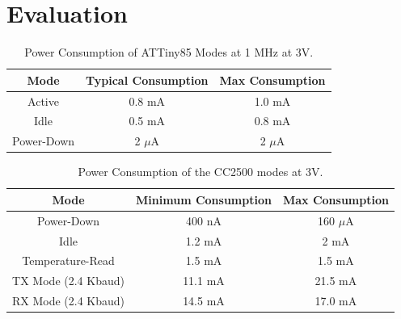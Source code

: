 \section{Evaluation}
\label{section:evaluation}

%
%
\begin{table}%
  \begin{center}
  
  \begin{tabular}{| c | c | c |}

  \hline
  \textbf{Mode} & \textbf{Typical Consumption} & \textbf{Max Consumption} \\
  \hline
  Active      & 0.8 mA & 1.0 mA \\
  Idle        & 0.5 mA & 0.8 mA \\
  Power-Down  & 2 $\mu$A & 2 $\mu$A \\
  \hline
  
  \end{tabular}
  \end{center}
  \caption{Power Consumption of ATTiny85 Modes at 1 MHz at 3V.
  \label{table:attiny85_power}  
  }
\end{table}

%
%
\begin{table}%
  \begin{center}
  
  \begin{tabular}{| c | c | c |}

  \hline
  \textbf{Mode} & \textbf{Minimum Consumption} & \textbf{Max Consumption} \\
  \hline
  Power-Down        & 400 nA & 160 $\mu$A \\
  Idle              & 1.2 mA & 2 mA \\
  Temperature-Read  & 1.5 mA & 1.5 mA \\
  TX Mode (2.4 Kbaud) & 11.1 mA & 21.5 mA \\
  RX Mode (2.4 Kbaud) & 14.5 mA & 17.0 mA \\
  \hline
  
  \end{tabular}  
  \end{center}
  \caption{Power Consumption of the CC2500 modes at 3V.
  \label{table:cc2500_power}  
  }
\end{table}

